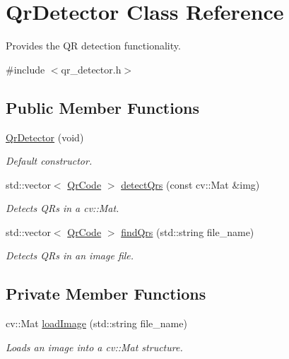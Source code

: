 \hypertarget{classQrDetector}{\section{Qr\-Detector Class Reference}
\label{classQrDetector}
}


Provides the Q\-R detection functionality.  




{\ttfamily \#include $<$qr\-\_\-detector.\-h$>$}

\subsection*{Public Member Functions}
\begin{DoxyCompactItemize}
\item 
\hyperlink{classQrDetector_a467c4d4f36bc4d8ec4f3be3880b57f96}{Qr\-Detector} (void)
\begin{DoxyCompactList}\small\item\em Default constructor. \end{DoxyCompactList}\item 
std\-::vector$<$ \hyperlink{structQrCode}{Qr\-Code} $>$ \hyperlink{classQrDetector_a1f70c86fb01592acb1da2246891e93e2}{detect\-Qrs} (const cv\-::\-Mat \&img)
\begin{DoxyCompactList}\small\item\em Detects Q\-Rs in a cv\-::\-Mat. \end{DoxyCompactList}\item 
std\-::vector$<$ \hyperlink{structQrCode}{Qr\-Code} $>$ \hyperlink{classQrDetector_a2e4bb3be2d9c6a6b7243e9e78402dee9}{find\-Qrs} (std\-::string file\-\_\-name)
\begin{DoxyCompactList}\small\item\em Detects Q\-Rs in an image file. \end{DoxyCompactList}\end{DoxyCompactItemize}
\subsection*{Private Member Functions}
\begin{DoxyCompactItemize}
\item 
cv\-::\-Mat \hyperlink{classQrDetector_a46da54e3da81d4ccc8cee7323237f648}{load\-Image} (std\-::string file\-\_\-name)
\begin{DoxyCompactList}\small\item\em Loads an image into a cv\-::\-Mat structure. \end{DoxyCompactList}\end{DoxyCompactItemize}


